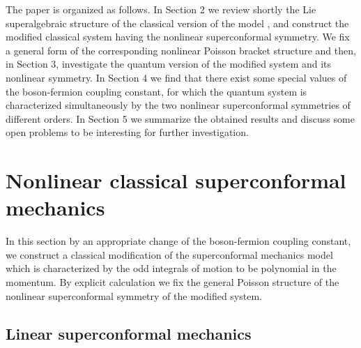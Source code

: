 \documentclass[a4paper,12pt]{article}
\begin{document}
The paper is organized as follows.
In Section 2 we review shortly the
\coordHE{} Lie superalgebraic structure
of the classical version of the model
\cite{AP,FR}, and construct
the modified classical system
having the nonlinear superconformal symmetry.
We fix a general form of the corresponding
nonlinear Poisson bracket structure and then,
in Section 3, investigate
the quantum version of the modified system
and its nonlinear symmetry.
In Section 4 we find that there exist some
special values of the boson-fermion coupling
constant, for which the quantum system
is characterized simultaneously by
the two nonlinear superconformal symmetries
of different orders. In Section 5
we summarize the obtained results
and discuss some open problems to be interesting
for further investigation.



\section{Nonlinear classical superconformal mechanics}

In this section by an appropriate
change of the boson-fermion coupling constant,
we construct a classical modification of the
superconformal mechanics model
\cite{AP,FR} which is characterized by the odd integrals of
motion
to be polynomial in the momentum.
By explicit calculation we fix the
general Poisson structure
of the nonlinear superconformal symmetry
of the modified system.


\subsection{Linear superconformal mechanics}
\end{document}
